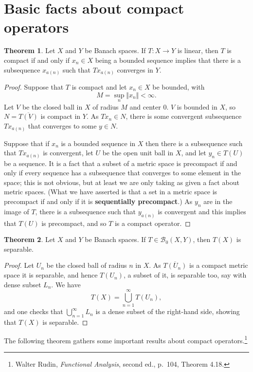 \documentclass{article}
\newcommand{\norm}[1]{\Vert #1 \Vert}
\theoremstyle{definition}
\newtheorem{theorem}{Theorem}
\begin{document}
\section{Basic facts about compact operators}
\begin{theorem}
Let $X$ and $Y$ be Banach spaces.
If $T:X \to Y$ is linear, then $T$ is compact if and only if $x_n \in X$ being a bounded sequence implies that there
is a subsequence $x_{a(n)}$ such that $Tx_{a(n)}$ converges in $Y$.
\end{theorem}
\begin{proof}
Suppose that $T$ is compact and let $x_n \in X$ be bounded, with
\[
M = \sup_n \norm{x_n}<\infty.
\] 
Let $V$ be the closed ball in $X$ of radius $M$ and center $0$. $V$ is bounded in $X$,
so $N=\overline{T(V)}$ is compact in $Y$.
As $Tx_n \in N$, there is some convergent subsequence $Tx_{a(n)}$ that converges to some $y \in N$.

Suppose that if $x_n$ is a bounded sequence in $X$ then there is a subsequence such that $Tx_{a(n)}$ is convergent,  let $U$ be the open unit ball in $X$,
and let $y_n \in T(U)$ be a sequence. It is a fact that a subset of a metric space is precompact if and only if every sequence has a subsequence that converges to some
element in the space; this is not obvious, but at least we are only taking as given a fact about metric spaces. (What we have asserted is that a set in a metric space
is precompact if and only if it is \textbf{sequentially precompact}.) As $y_n$ are in the image of $T$, there is a subsequence such that $y_{a(n)}$ is convergent and
this implies that $T(U)$ is precompact, and so $T$ is a compact operator.
\end{proof}


\begin{theorem}
Let $X$ and $Y$ be Banach spaces. If $T \in \mathscr{B}_0(X,Y)$, then $T(X)$ is separable.
\end{theorem}
\begin{proof}
Let $U_n$ be the closed ball of radius $n$ in $X$. As $\overline{T(U_n)}$ is a compact metric space it is separable, and hence $T(U_n)$, a subset of it, is separable too, say with dense subset $L_n$. 
We have
\[
T(X) = \bigcup_{n=1}^\infty T(U_n),
\]
and one checks that $\bigcup_{n=1}^\infty L_n$ is a dense subset of the right-hand side, showing that $T(X)$ is separable.
\end{proof}


The following theorem gathers some important results about compact operators.\footnote{Walter Rudin, {\em Functional Analysis},
second ed., p.~104, Theorem 4.18.}
\end{document}
